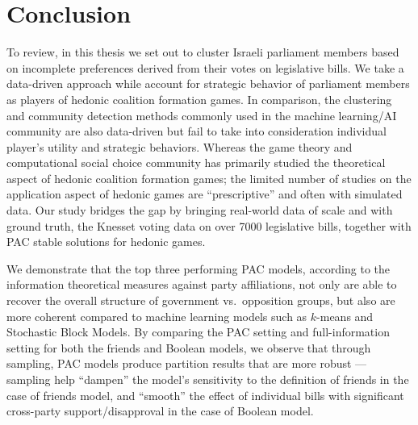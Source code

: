 \chapter{Conclusion}
\label{ch:concl}

To review, in this thesis we set out to cluster Israeli parliament members
based on incomplete preferences derived from their votes on legislative bills.
We take a data-driven approach while account for strategic behavior of
parliament members as players of hedonic coalition formation games.
In comparison, the clustering and community detection methods commonly used in
the machine learning/AI community are also data-driven but fail to take into
consideration individual player's utility and strategic behaviors.
Whereas the game theory and computational social choice community has primarily
studied the theoretical aspect of hedonic coalition formation games;
the limited number of studies on the application aspect of hedonic games are
``prescriptive'' and often with simulated data.
Our study bridges the gap by bringing real-world data of scale and with ground
truth, the Knesset voting data on over 7000 legislative bills, together with
PAC stable solutions for hedonic games.

We demonstrate that the top three performing PAC models, according to the
information theoretical measures against party affiliations, not only are able
to recover the overall structure of government vs.\ opposition groups, but also
are more coherent compared to machine learning models such as $k$-means and
Stochastic Block Models.
By comparing the PAC setting and full-information setting for both the friends
and Boolean models, we observe that through sampling, PAC models produce
partition results that are more robust --- sampling help ``dampen'' the
model's sensitivity to the definition of friends in the case of friends model,
and ``smooth'' the effect of individual bills with significant cross-party
support/disapproval in the case of Boolean model.
